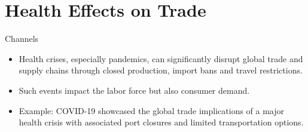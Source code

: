 \documentclass{beamer}
\begin{document}

\section{Health Effects on Trade}
\begin{frame}{Channels}
    \begin{itemize}
        \item Health crises, especially pandemics, can significantly disrupt global trade and supply chains through closed production, import bans and travel restrictions.
        \item Such events impact the labor force but also consumer demand.
        \item Example: COVID-19 showcased the global trade implications of a major health crisis with associated port closures and limited transportation options.
    \end{itemize}
\end{frame}
\end{document}
